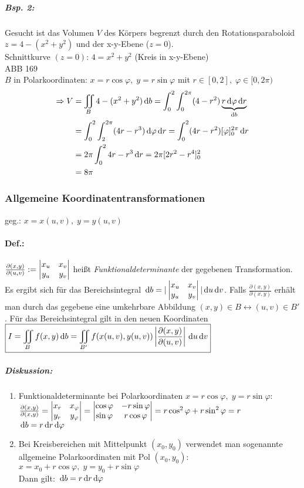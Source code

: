 \subparagraph{Bsp. 2:} Gesucht ist das Volumen $V$ des Körpers begrenzt durch den Rotationsparaboloid $z=4-(x^2+y^2)$ und der x-y-Ebene ($z=0$).\\
Schnittkurve $(z=0)$: $4=x^2+y^2$ (Kreis in x-y-Ebene)\\
ABB 169\\
$B$ in Polarkoordinaten: $x=r\cos \varphi, \; y=r\sin\varphi$ mit $r\in[0,2], \; \varphi \in [0,2\pi)$
\begin{align*}
\Rightarrow V &= \iint_B 4-(x^2+y^2)\,\mathrm{d}b= \int_0^2 \int_0^{2\pi} (4-r^2)\underbrace{r \,\mathrm{d}\varphi \,\mathrm{d}r}_{\mathrm{d}b}\\
&= \int_0^2 \int_2^{2\pi} (4r-r^3) \,\mathrm{d}\varphi\,\mathrm{d}r=\int_0^2(4r-r^2)[\varphi]_0^{2\pi} \,\mathrm{d}r\\
&= 2\pi \int_0^2 4r-r^3\,\mathrm{d}r=2\pi [2r^2-r^4]_0^2\\
&= 8 \pi
\end{align*}
\subsubsection{Allgemeine Koordinatentransformationen}
geg.: $\boxed{x=x(u,v) ,\; y=y(u,v)}$
\paragraph{Def.:} $\frac{\partial (x,y)}{\partial (u,v)} := \begin{vmatrix}x_u & x_v\\ y_u & y_v\end{vmatrix}$ heißt \emph{Funktionaldeterminante} der gegebenen Transformation.\\
Es ergibt sich für das Bereichsintegral $\,\mathrm{d}b=|\begin{vmatrix}x_u & x_v\\ y_u & y_v\end{vmatrix}| \,\mathrm{d}u \,\mathrm{d}v$. Falls $\frac{\partial (x,y)}{\partial (x,y)}$ erhält man durch das gegebene eine umkehrbare Abbildung $(x,y) \in B \leftrightarrow (u,v) \in B'$. Für das Bereichsintegral gilt in den neuen Koordinaten $\boxed{I=\iint_B f(x,y) \,\mathrm{d}b= \iint_{B'}f(x(u,v), y(u,v)) \left| \frac{\partial (x,y)}{\partial (u,v)}\right| \,\mathrm{d}u\,\mathrm{d}v}$

\subparagraph{Diskussion:}
\begin{enumerate}
\item Funktionaldeterminante bei Polarkoordinaten $x=r\cos \varphi, \; y=r\sin \varphi$:\\
$\frac{\partial (x,y)}{\partial (x,y)}=\begin{vmatrix}x_r & x_\varphi \\ y_r & y_\varphi\end{vmatrix}=\begin{vmatrix}\cos \varphi & - r \sin \varphi \\ \sin \varphi & r \cos \varphi\end{vmatrix} = r \cos ^2\varphi + r \sin^2 \varphi = r$\\
$\,\mathrm{d}b=r\,\mathrm{d}r\,\mathrm{d}\varphi$
\item Bei Kreisbereichen mit Mittelpunkt $(x_0,y_0)$ verwendet man sogenannte allgemeine Polarkoordinaten mit Pol $(x_0,y_0)$: $x=x_0+r\cos \varphi,\; y=y_0+r\sin\varphi$\\
Dann gilt: $\,\mathrm{d}b=r\,\mathrm{d}r\,\mathrm{d}\varphi$
\end{enumerate}

